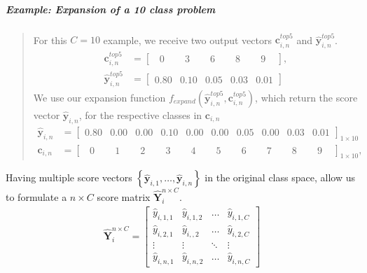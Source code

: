 \subparagraph{Example: Expansion of a 10 class problem} 
\blockquote[]{	 	
	For this $C=10$ example, we receive two output vectors $\bm{c}_{i,n}^{top5}$ and $ \bm{\hat{y}}_{i,n}^{top5}$.
	\begin{align*}
	\mathbf{c}_{i,n}^{top5} &= \begin{bmatrix}
	\phantom{0}0\phantom{.0} & \phantom{0}3\phantom{.0} & \phantom{0}6\phantom{.0} & \phantom{0}8\phantom{.0} & \phantom{0}9\phantom{.0}
	\end{bmatrix},\\
	\bm{\hat{y}}_{i,n}^{top5} &= \begin{bmatrix}
	0.80 & 0.10 & 0.05 & 0.03 & 0.01
	\end{bmatrix}
	\end{align*}
	We use our expansion function $ f_{expand}\left(\bm{\hat{y}}_{i,n}^{top5},\mathbf{c}_{i,n}^{top5}\right) $, which return the score vector $ \mathbf{\hat{y}}_{i,n}$, for the respective classes in $ \bm{c}_{i,n} $
	\begin{align*}
	\mathbf{\hat{y}}_{i,n}  &= \begin{bmatrix}
	0.80 & 0.00 & 0.00 & 0.10 & 0.00 & 0.00 & 0.05 & 0.00 & 0.03 & 0.01
	\end{bmatrix}_{1 \times 10} \\
	\bm{c}_{i,n} &= \begin{bmatrix}
	\phantom{0}0\phantom{.0} & \phantom{0}1\phantom{.0} & \phantom{0}2\phantom{.0} & \phantom{0}3\phantom{.0} & \phantom{0}4\phantom{.0} & \phantom{0}5\phantom{.0} & \phantom{0}6\phantom{.0} & \phantom{0}7\phantom{.0} & \phantom{0}8\phantom{.0} & \phantom{0}9\phantom{.0}
	\end{bmatrix}_{1 \times 10},
	\end{align*}
}      

Having multiple score vectors $ \left\{\bm{\hat{y}}_{i,1}, \dots, \bm{\hat{y}}_{i,n}\right\}  $ in the original class space, allow us to formulate a $ n \times C $ score matrix $ \bm{\hat{Y}}_{i}^{n \times C} $.
\begin{align}
	\bm{\hat{Y}}_{i}^{n \times C} =
	\begin{bmatrix}
		\hat{y}_{i,1,1} & \hat{y}_{i,1,2} & \dots & \hat{y}_{i,1,C} \\
		\hat{y}_{i,2,1} & \hat{y}_{i,,2} & \dots & \hat{y}_{i,2,C} \\
		\vdots & \vdots & \ddots & \vdots \\
		\hat{y}_{i,n,1} & \hat{y}_{i,n,2} & \dots & \hat{y}_{i,n,C}
	\end{bmatrix}
\end{align}

